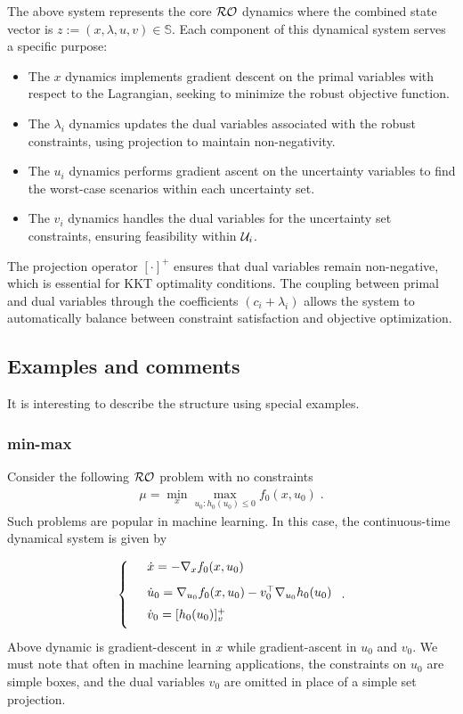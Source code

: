 \documentclass[journal,twoside,web]{ieeecolor}
\newcommand{\rev}[1]{\textcolor{revisionblue}{#1}}
\begin{document}
\rev{The above system represents the core ${\cal RO}$ dynamics where the combined state vector is $z:=(x,\lambda,u,v) \in \mathbb{S}$. Each component of this dynamical system serves a specific purpose:

\begin{itemize}
\item The $x$ dynamics implements gradient descent on the primal variables with respect to the Lagrangian, seeking to minimize the robust objective function.
\item The $\lambda_i$ dynamics updates the dual variables associated with the robust constraints, using projection to maintain non-negativity.
\item The $u_i$ dynamics performs gradient ascent on the uncertainty variables to find the worst-case scenarios within each uncertainty set.
\item The $v_i$ dynamics handles the dual variables for the uncertainty set constraints, ensuring feasibility within ${\cal U}_i$.
\end{itemize}

The projection operator $[\cdot]^+$ ensures that dual variables remain non-negative, which is essential for KKT optimality conditions. The coupling between primal and dual variables through the coefficients $(c_i+\lambda_i)$ allows the system to automatically balance between constraint satisfaction and objective optimization.}

\subsection{Examples and comments} \label{examples_and_comments}
It is interesting to describe the structure using special examples.

\subsubsection{min-max} Consider the following ${\cal RO}$ problem with no constraints
\begin{align*}
\mu=\min_x\max_{u_0:h_0(u_0)\leq 0}f_0(x,u_0)\;.
\end{align*}
Such problems are popular in machine learning. In this case, the continuous-time dynamical system is given by

\begin{align*}
\left\{
\begin{array}{cl}
\vspace{3mm}
&\dot{x}=-\nabla_x f_0(x,u_0)\\
\vspace{2mm}
&\dot{u}_0=\nabla_{u_0}f_0(x,u_0)-v_0^\top \nabla_{u_0} h_0(u_0)\\
\vspace{2mm}
&\dot{v}_0=[h_0(u_0)]_v^+
\end{array}\right..
\end{align*}
Above dynamic is gradient-descent in $x$ while gradient-ascent in $u_0$ and $v_0$. We must note that often in machine learning applications, the constraints on $u_0$ are simple boxes, and the dual variables $v_0$ are omitted in place of a simple set projection.
\end{document}
